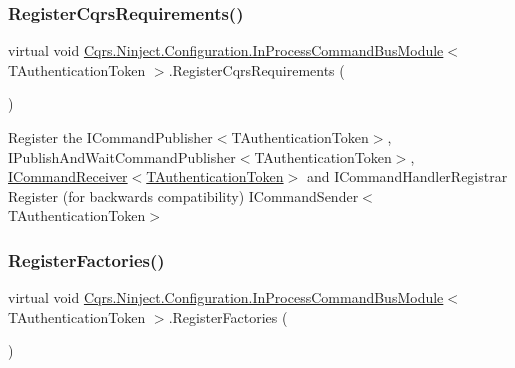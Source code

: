 \subsubsection{\texorpdfstring{Register\+Cqrs\+Requirements()}{RegisterCqrsRequirements()}}
{\footnotesize\ttfamily virtual void \hyperlink{classCqrs_1_1Ninject_1_1Configuration_1_1InProcessCommandBusModule}{Cqrs.\+Ninject.\+Configuration.\+In\+Process\+Command\+Bus\+Module}$<$ T\+Authentication\+Token $>$.Register\+Cqrs\+Requirements (\begin{DoxyParamCaption}{ }\end{DoxyParamCaption})\hspace{0.3cm}{\ttfamily [virtual]}}



Register the I\+Command\+Publisher$<$\+T\+Authentication\+Token$>$, I\+Publish\+And\+Wait\+Command\+Publisher$<$\+T\+Authentication\+Token$>$, \hyperlink{interfaceCqrs_1_1Commands_1_1ICommandReceiver}{I\+Command\+Receiver$<$\+T\+Authentication\+Token$>$} and I\+Command\+Handler\+Registrar Register (for backwards compatibility) I\+Command\+Sender$<$\+T\+Authentication\+Token$>$ 

\mbox{\label{classCqrs_1_1Ninject_1_1Configuration_1_1InProcessCommandBusModule_a4591fb32f9ec60e3246a9864ab3288cd_a4591fb32f9ec60e3246a9864ab3288cd}} 
\subsubsection{\texorpdfstring{Register\+Factories()}{RegisterFactories()}}
{\footnotesize\ttfamily virtual void \hyperlink{classCqrs_1_1Ninject_1_1Configuration_1_1InProcessCommandBusModule}{Cqrs.\+Ninject.\+Configuration.\+In\+Process\+Command\+Bus\+Module}$<$ T\+Authentication\+Token $>$.Register\+Factories (\begin{DoxyParamCaption}{ }\end{DoxyParamCaption})\hspace{0.3cm}{\ttfamily [virtual]}}



